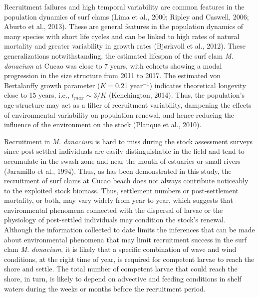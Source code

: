 \documentclass[12pt]{article}
\begin{document}
Recruitment failures and high temporal variability are common features
in the population dynamics of surf clams (Lima et al., 2000; Ripley and
Caswell, 2006; Aburto et al., 2013). These are general features in the
population dynamics of many species with short life cycles and can be
linked to high rates of natural mortality and greater variability in
growth rates (Bjørkvoll et al., 2012). These generalizations
notwithstanding, the estimated lifespan of the surf clam \emph{M.
donacium} at Cucao was close to 7 years, with cohorts showing a modal
progression in the size structure from 2011 to 2017. The estimated von
Bertalanffy growth parameter (\(K=0.21\) year\(^{-1}\)) indicates
theoretical longevity close to 15 years, i.e., \(t_{max} \sim 3/K\)
(Kenchington, 2014). Thus, the population's age-structure may act as a
filter of recruitment variability, dampening the effects of
environmental variability on population renewal, and hence reducing the
influence of the environment on the stock (Planque et al., 2010).

Recruitment in \emph{M. donacium} is hard to miss during the stock
assessment surveys since post-settled individuals are easily
distinguishable in the field and tend to accumulate in the swash zone
and near the mouth of estuaries or small rivers (Jaramillo et al.,
1994). Thus, as has been demonstrated in this study, the recruitment of
surf clams at Cucao beach does not always contribute noticeably to the
exploited stock biomass. Thus, settlement numbers or post-settlement
mortality, or both, may vary widely from year to year, which suggests
that environmental phenomena connected with the dispersal of larvae or
the physiology of post-settled individuals may condition the stock's
renewal. Although the information collected to date limits the
inferences that can be made about environmental phenomena that may limit
recruitment success in the surf clam \emph{M. donacium}, it is likely
that a specific combination of wave and wind conditions, at the right
time of year, is required for competent larvae to reach the shore and
settle. The total number of competent larvae that could reach the shore,
in turn, is likely to depend on advective and feeding conditions in
shelf waters during the weeks or months before the recruitment period.
\end{document}
